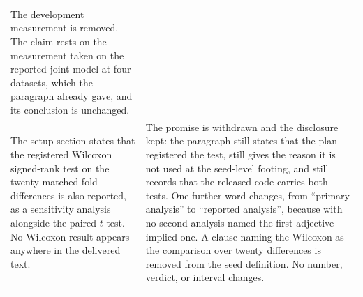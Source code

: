 \begin{table}[htb]
\begin{tabular}{@{}p{}p{}@{}}
The development measurement is removed. The claim rests on the
measurement taken on the reported joint model at four
datasets, which the paragraph already gave, and its conclusion
is unchanged. \\
\addlinespace
The setup section states that the registered Wilcoxon signed-rank test on the twenty
matched fold differences is also reported, as a sensitivity analysis alongside the paired
$t$ test. No Wilcoxon result appears anywhere in the delivered text. &
The promise is withdrawn and the disclosure kept: the paragraph still states that the plan
registered the test, still gives the reason it is not used at the seed-level footing, and still
records that the released code carries both tests. One further word changes, from ``primary
analysis'' to ``reported analysis'', because with no second analysis named the first adjective
implied one. A clause naming the Wilcoxon as the comparison over twenty differences is removed
from the seed definition. No number, verdict, or interval changes. \\
\addlinespace

\end{tabular}
\end{table}
